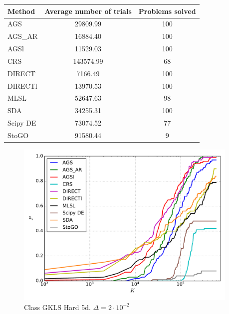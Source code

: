 \documentclass[a4paper]{article}
\begin{document}
\begin{tabular}{lcc}
\hline
 Method   &  Average number of trials  &  Problems solved  \\
\hline
 AGS      &          29809.99          &        100        \\
 AGS\_AR   &          16884.40          &        100        \\
 AGSl     &          11529.03          &        100        \\
 CRS      &         143574.99          &        68         \\
 DIRECT   &          7166.49           &        100        \\
 DIRECTl  &          13970.53          &        100        \\
 MLSL     &          52647.63          &        98         \\
 SDA      &          34255.31          &        100        \\
 Scipy DE &          73074.52          &        77         \\
 StoGO    &          91580.44          &         9         \\
\hline
\end{tabular}
\begin{figure}[H]
  \center
  \includegraphics[width=0.95\textwidth]{../experiments/gklsh5d/cmc.pdf}
  \caption{Class GKLS Hard 5d. $\Delta=2\cdot10^{-2}$}
\end{figure}
\end{document}
